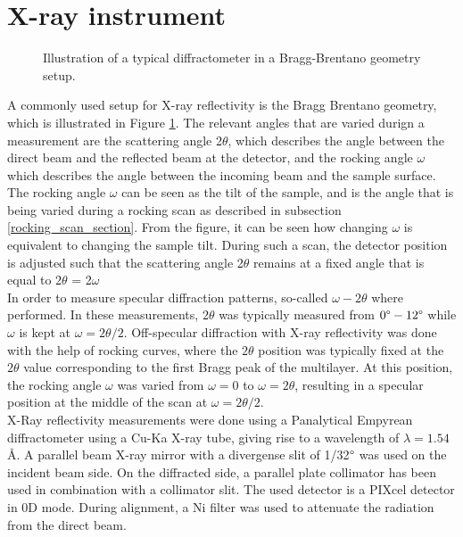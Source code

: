 \section{X-ray instrument}\label{XRR_instrument}
\begin{figure}[b]
	\centering
	\def\svgwidth{\textwidth}
	
	\caption{Illustration of a typical diffractometer in a Bragg-Brentano geometry setup.}
\label{BraggBrentano}
\end{figure}
A commonly used setup for X-ray reflectivity is the Bragg Brentano geometry, which is illustrated in Figure \ref{BraggBrentano}. The relevant angles that are varied durign a measurement are the scattering angle 2$\theta$, which describes the angle between the direct beam and the reflected beam at the detector, and the rocking angle $\omega$ which describes the angle between the incoming beam and the sample surface. The rocking angle $\omega$ can be seen as the tilt of the sample, and is the angle that is being varied during a rocking scan as described in subsection \ref{rocking_scan_section}. From the figure, it can be seen how changing $\omega$ is equivalent to changing the sample tilt. During such a scan, the detector position is adjusted such that the scattering angle 2$\theta$ remains at a fixed angle that is equal to $2\theta$ = 2$\omega$\\
In order to measure specular diffraction patterns, so-called $\omega-2\theta$ where performed. In these measurements, $2\theta$ was typically measured from  $0\degree-12  \degree$ while $\omega$ is kept at $\omega = 2\theta/2$. Off-specular diffraction with X-ray reflectivity was done with the help of rocking curves, where the $2\theta$ position was typically fixed at the $2\theta$ value corresponding to the first Bragg peak of the multilayer. At this position, the rocking angle $\omega$ was varied from $\omega= 0$ to $\omega =  2\theta$, resulting in a specular position at the middle of the scan at $\omega = 2\theta/2$. \\
X-Ray reflectivity measurements were done using a Panalytical Empyrean diffractometer using a Cu-Ka X-ray tube, giving rise to a wavelength of $\lambda = 1.54$ Å. A parallel beam X-ray mirror with a divergense slit  of 1/32$\degree$ was used on the incident beam side.  On the diffracted side, a parallel plate collimator has been used in combination with a collimator slit. The used detector is a PIXcel detector in 0D mode. During alignment, a Ni filter was used to attenuate the radiation from the direct beam.


